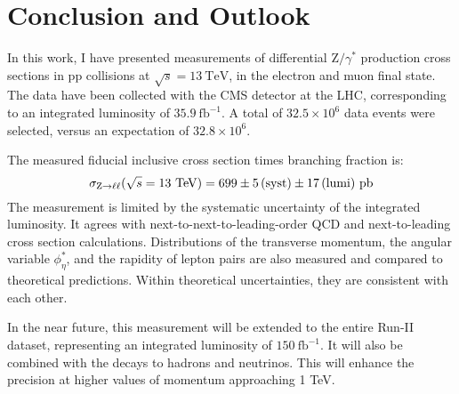 \chapter{Conclusion and Outlook}

In this work, I have presented measurements of differential $\mathrm{Z}/\gamma^{*}$ production cross sections in $\mathrm{p}\mathrm{p}$ collisions at $\sqrt{s}=13~\mathrm{TeV}$,
in the electron and muon final state.
The data have been collected with the CMS detector at the LHC, corresponding to an integrated luminosity of $35.9~\mathrm{fb}^{-1}$.
A total of $32.5 \times 10^{6}$ data events were selected, versus an expectation of $32.8 \times 10^{6}$.

The measured fiducial inclusive cross section times branching fraction is: 
\begin{equation*}
\sigma_{\mathrm{Z} \to \ell\ell}(\sqrt{s}=13~\mathrm{TeV}) = 699\pm5\,\text{(syst)}\pm17\,\text{(lumi)}~\mathrm{pb}
\end{equation*}
The measurement is limited by the systematic uncertainty of the integrated luminosity.
It agrees with next-to-next-to-leading-order QCD and next-to-leading cross section calculations. 
Distributions of the transverse momentum, the angular variable $\phi^{*}_\eta$, and the rapidity of lepton pairs are also measured and compared to theoretical predictions.
Within theoretical uncertainties, they are consistent with each other.

In the near future, this measurement will be extended to the entire Run-II dataset,
representing an integrated luminosity of $150~\mathrm{fb}^{-1}$.
It will also be combined with the decays to hadrons and neutrinos.
This will enhance the precision at higher values of momentum approaching 1 TeV.

